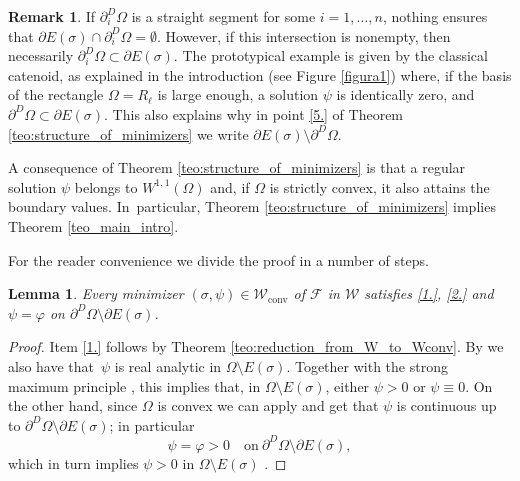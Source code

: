 \documentclass[JEP,XML,SOM,Unicode, NoFloatCountersInSection,published]{cedram}
\newcommand{\largercomp}{\mathcal W}
\let\Om\Omega
\newcommand\admclassconv{{\mathcal W_\mathrm{conv}}}
\newtheorem{lemma}[theorem]{Lemma}
\theoremstyle{definition}
\newtheorem{remark}[theorem]{Remark}
\begin{document}
\begin{remark}
If $\partial_i^D\Omega$ is a straight segment for some $i=1,\dots,n$,
nothing ensures that $\partial E(\sigma)\cap \partial_i^D\Omega=\emptyset$. However, if this intersection is nonempty, then necessarily
$\partial_i^D\Omega\subset\partial E(\sigma)$. The
prototypical example is given by the classical catenoid, as explained in the introduction (see Figure \ref{figura1}) where, if the basis of the rectangle $\Omega=R_{\ell}$ is large enough, a solution $\psi$ is identically zero, and $\partial^D\Omega\subset\partial E(\sigma)$.
This also explains why in point \ref{5.} of Theorem \ref{teo:structure_of_minimizers} we write $\partial E(\sigma)\setminus \partial^D\Omega$.
\end{remark}

A consequence of Theorem \ref{teo:structure_of_minimizers} is that a regular solution $\psi$ belongs to $W^{1,1}(\Om)$ and, if $\Om$ is strictly convex, it also attains the boundary values. In~particular, Theorem \ref{teo:structure_of_minimizers} implies Theorem \ref{teo_main_intro}.

For the reader convenience we divide the proof in a number of steps.
\begin{lemma}\label{lem:analicity}
Every minimizer $(\sigma,\psi)\in\admclassconv$ of $\mathcal F$ in
$\largercomp$ satisfies \ref{1.}, \ref{2.} and
$\psi=\varphi$ on $\partial^D\Om\setminus\partial E(\sigma)$.
\end{lemma}
\begin{proof} Item \ref{1.} follows by Theorem \ref{teo:reduction_from_W_to_Wconv}.
By \cite[Th.\,14.13]{Giusti:84}
we also have that~$\psi$ is real analytic in $\Om\setminus E(\sigma)$. Together with the strong maximum principle \cite[Th.\,C.4]{Giusti:84}, this implies that,
in $\Om\setminus E(\sigma)$,
either $\psi>0$ or $\psi\equiv0$.
On the other hand,
since $\Omega$ is convex we can apply \cite[Th.\,15.9]{Giusti:84} and get that $\psi$ is continuous up to $\partial^D\Om\setminus\partial E(\sigma)$; in particular
\begin{equation}\label{eq:boundary_value}
\psi=\varphi>0\quad\text{on}\ \partial^D\Omega\setminus\partial E(\sigma),
\end{equation}
which in turn implies $\psi>0$ in $\Omega\setminus E(\sigma)$ .
\end{proof}
\end{document}
